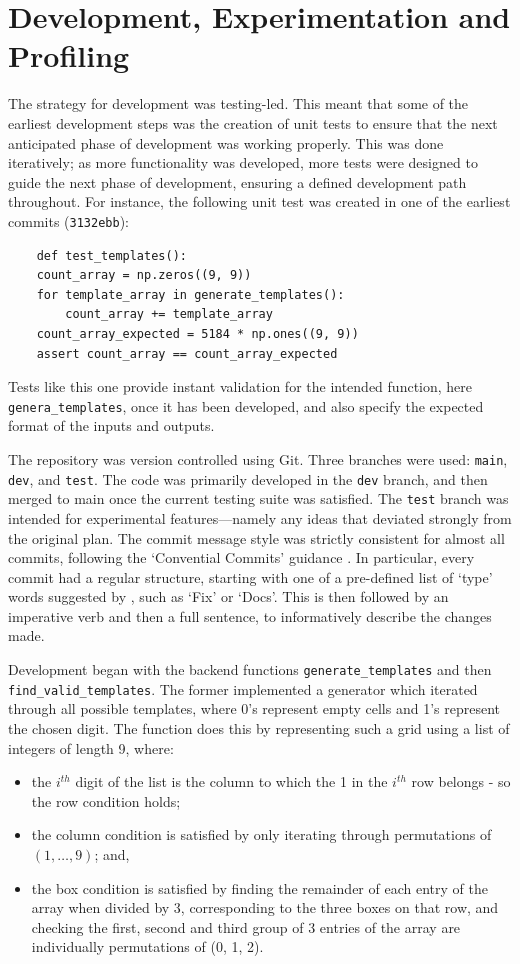 \documentclass[12pt]{article}
\begin{document}
\section*{Development, Experimentation and Profiling}
The strategy for development was testing-led.
This meant that some of the earliest development steps was the creation of unit tests to ensure that the next anticipated phase of development was working properly.
This was done iteratively; as more functionality was developed, more tests were designed to guide the next phase of development, ensuring a defined development path throughout.
For instance, the following unit test was created in one of the earliest commits (\texttt{3132ebb}):

\begin{lstlisting}
    def test_templates():
    count_array = np.zeros((9, 9))
    for template_array in generate_templates():
        count_array += template_array
    count_array_expected = 5184 * np.ones((9, 9))
    assert count_array == count_array_expected
\end{lstlisting}

Tests like this one provide instant validation for the intended function, here \texttt{genera\_templates}, once it has been developed, and also specify the expected format of the inputs and outputs.

The repository was version controlled using Git.
Three branches were used: \texttt{main}, \texttt{dev}, and \texttt{test}.
The code was primarily developed in the \texttt{dev} branch, and then merged to main once the current testing suite was satisfied.
The \texttt{test} branch was intended for experimental features---namely any ideas that deviated strongly from the original plan.
The commit message style was strictly consistent for almost all commits, following the `Convential Commits' guidance \cite{ccommits}.
In particular, every commit had a regular structure, starting with one of a pre-defined list of `type' words suggested by \cite{ccommits}, such as `Fix' or `Docs'.
This is then followed by an imperative verb and then a full sentence, to informatively describe the changes made.

Development began with the backend functions \texttt{generate\_templates} and then \texttt{find\_valid\_templates}.
The former implemented a generator which iterated through all possible templates, where 0's represent empty cells and 1's represent the chosen digit.
The function does this by representing such a grid using a list of integers of length 9, where:
\begin{itemize}
    \item the $i^{th}$ digit of the list is the column to which the 1 in the $i^{th}$ row belongs - so the row condition holds;
    \item the column condition is satisfied by only iterating through permutations of $(1,\ldots,9)$; and,
    \item the box condition is satisfied by finding the remainder of each entry of the array when divided by 3, corresponding to the three boxes on that row, and checking the first, second and third group of 3 entries of the array are individually permutations of (0, 1, 2).
\end{itemize}
\end{document}
